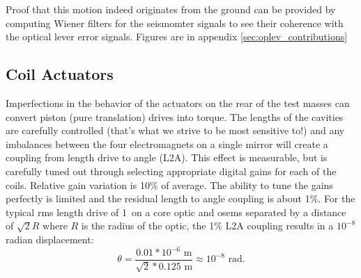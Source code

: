 Proof that this motion indeed originates from the ground can be provided by computing Wiener filters for the seismomter signals to see their coherence with the optical lever error signals. Figures are in appendix \ref{sec:oplev_contributions}











\subsection{Coil Actuators} 
\label{sec:L2A}
Imperfections in the behavior of the actuators on the rear of the test masses can convert piston (pure translation) drives into torque. The lengths of the cavities are carefully controlled (that's what we strive to be most sensitive to!) and any imbalances between the four electromagnets on a single mirror will create a coupling from length drive to angle (L2A). This effect is measurable, but is carefully tuned out through selecting appropriate digital gains for each of the coils. Relative gain variation is 10\% of average. The ability to tune the gains perfectly is limited and the residual length to angle coupling is about 1\%. For the typical rms length drive of 1~\micron on a core optic and osems separated by a distance of $\sqrt{2} R$ where $R$ is the radius of the optic, the 1\% L2A coupling results in a $10^{-8}$ radian displacement: \begin{equation} \theta = \frac{0.01 * 10^{-6} \mbox{ m}}{\sqrt{2} * 0.125 \mbox{ m}} \approx 10^{-8} \mbox{ rad}.  \end{equation}

